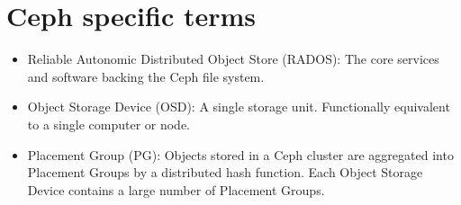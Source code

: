 \section{Ceph specific terms}

\begin{itemize}
  \item Reliable Autonomic Distributed Object Store (RADOS): The core services and software backing the Ceph file system.
  
  \item Object Storage Device (OSD): A single storage unit. Functionally equivalent to a single computer or node.

  \item Placement Group (PG): Objects stored in a Ceph cluster are aggregated into
   Placement Groups by a distributed hash function. Each Object Storage Device
   contains a large number of Placement Groups.

\end{itemize}
